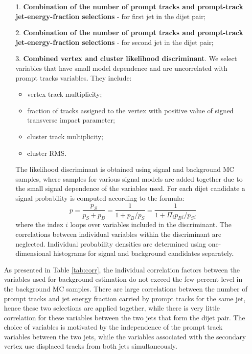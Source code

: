 \begin{itemize}     
\item[1.] {\bf Combination of the number of prompt tracks and prompt-track jet-energy-fraction selections} - for first jet in the dijet pair;
\item[2.] {\bf Combination of the number of prompt tracks and prompt-track jet-energy-fraction selections} - for second jet in the dijet pair;
\item[3.] {\bf Combined vertex and cluster likelihood discriminant}. 
We select variables that have small model dependence and are 
uncorrelated with prompt tracks variables. They include:
\begin{itemize}
 \item vertex track multiplicity;
 \item fraction of tracks assigned to the vertex with positive value of signed transverse impact parameter;
 \item cluster track multiplicity;
 \item cluster RMS.
\end{itemize}  
The likelihood discriminant is obtained using signal and background MC samples, where samples for
various signal models are added together due to the small signal dependence of the variables used.
For each dijet candidate a signal probability is computed according to the formula:
\begin{equation}
p=\frac{p_S}{p_S+p_B}=\frac{1}{1+p_B/p_S}=\frac{1}{1+\Pi_i p_B{}_i/p_S{}_i}
\label{eqn:likelihood}
\end{equation}
where the index $i$ loops over variables included in the discriminant. The correlations between individual variables 
within the discriminant are
neglected. Individual probability densities are determined 
using one-dimensional histograms for signal and background candidates separately.
\end{itemize}

As presented in Table \ref{tab:corr}, the individual correlation factors between the variables used for background
estimation do not exceed the few-percent level in the background MC samples.
There are large correlations between the number of prompt tracks and jet energy fraction carried by prompt tracks 
for the same jet, hence these two selections are applied together, while there is very little correlation for these
variables between the two jets that form the dijet pair. The choice of variables is
motivated by the independence of the prompt track variables between the two jets,
 while the variables associated with the secondary vertex use displaced tracks
from both jets simultaneously.

